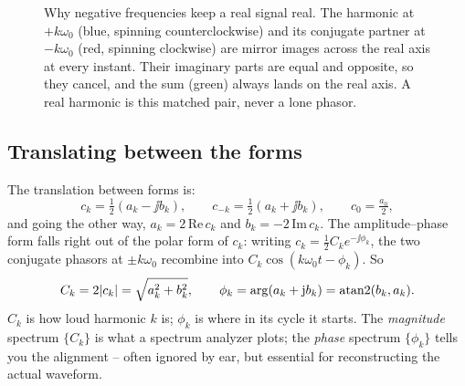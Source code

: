 \begin{figure}[H]
\centering
{}
\caption{Why negative frequencies keep a real signal real. The harmonic at $+k\omega_0$
(blue, spinning counterclockwise) and its conjugate partner at $-k\omega_0$ (red, spinning
clockwise) are mirror images across the real axis at every instant. Their imaginary parts
are equal and opposite, so they cancel, and the sum (green) always lands on the real axis.
A real harmonic is this matched pair, never a lone phasor.}
\label{ch06:fig-phasor}
\end{figure}

\subsection{Translating between the forms}

The translation between forms is:
\begin{equation}
c_k = \tfrac12(a_k - \jj b_k),\qquad c_{-k} = \tfrac12(a_k + \jj b_k),\qquad c_0 = \tfrac{a_0}{2},
\label{ch06:dict}
\end{equation}
and going the other way, \(a_k = 2\,\mathrm{Re}\,c_k\) and \(b_k = -2\,\mathrm{Im}\,c_k\).
The amplitude--phase form falls right out of the polar form of \(c_k\): writing
\(c_k = \tfrac12 C_k e^{-\jj\phi_k}\), the two conjugate phasors at \(\pm k\omega_0\) recombine into
\(C_k\cos(k\omega_0 t - \phi_k)\). So
\begin{equation}
C_k = 2\lvert c_k\rvert = \sqrt{a_k^2 + b_k^2},\qquad
\phi_k = \arg(a_k + \mathrm{j} b_k) = \operatorname{atan2}(b_k, a_k).
\label{ch06:ampphase}
\end{equation}
\(C_k\) is how loud harmonic \(k\) is; \(\phi_k\) is where in its cycle it starts. The
\emph{magnitude} spectrum \(\{C_k\}\) is what a spectrum analyzer plots; the \emph{phase}
spectrum \(\{\phi_k\}\) tells you the alignment -- often ignored by ear, but essential for
reconstructing the actual waveform.

